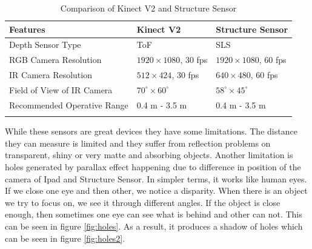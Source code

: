 \begin{table}[h]
\begin{tabular}{@{}lll@{}}
\toprule
\textbf{Features}                    & \textbf{Kinect V2}           & \textbf{Structure Sensor}         \\ \midrule
Depth Sensor Type           & ToF & SLS                 \\
RGB Camera Resolution       & $1920\times1080$, 30 fps & $1920\times1080$, 60 fps     \\
IR Camera Resolution        & $512\times424$, 30 fps   & $640\times480$, 60 fps                 \\ 
Field of View of IR Camera  & $70^\circ\times60^\circ$           & $58^\circ\times45^\circ$                         \\
Recommended Operative Range & 0.4 m - 3.5 m       & 0.4 m - 3.5 m                                  \\
           &                     & 
\end{tabular}
\caption{Comparison of Kinect V2 and Structure Sensor}
\label{table:KinectVsStructureSensor}
\end{table}

While these sensors are great devices they have some limitations. The distance they can measure is limited and they suffer from reflection problems on transparent, shiny or very matte and absorbing objects. Another limitation is holes generated by parallax effect happening due to difference in position of the camera of Ipad and Structure Sensor\cite{Kalantari}. In simpler terms, it works like human eyes. If we close one eye and then other, we notice a disparity. When there is an object we try to focus on, we see it through different angles. If the object is close enough, then sometimes one eye can see what is behind and other can not. This can be seen in figure \ref{fig:holes}. As a result, it produces a shadow of holes which can be seen in figure \ref{fig:holes2}.

